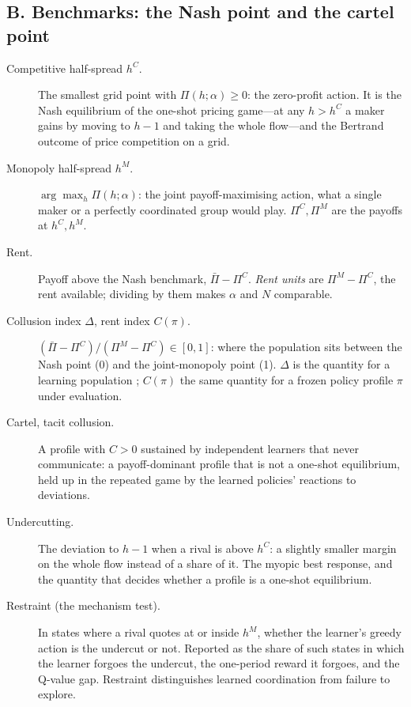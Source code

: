 \subsection*{B. Benchmarks: the Nash point and the cartel point}
\begin{description}
\item[Competitive half-spread $h^C$.] The smallest grid point with $\Pi(h;\alpha)\ge0$: the zero-profit action. It is the Nash equilibrium of the one-shot pricing game---at any $h>h^C$ a maker gains by moving to $h-1$ and taking the whole flow---and the Bertrand outcome of price competition on a grid.
\item[Monopoly half-spread $h^M$.] $\arg\max_h\Pi(h;\alpha)$: the joint payoff-maximising action, what a single maker or a perfectly coordinated group would play. $\Pi^C,\Pi^M$ are the payoffs at $h^C,h^M$.
\item[Rent.] Payoff above the Nash benchmark, $\bar\Pi-\Pi^C$. \emph{Rent units} are $\Pi^M-\Pi^C$, the rent available; dividing by them makes $\alpha$ and $N$ comparable.
\item[Collusion index $\Delta$, rent index $C(\pi)$.] $(\bar\Pi-\Pi^C)/(\Pi^M-\Pi^C)\in[0,1]$: where the population sits between the Nash point (0) and the joint-monopoly point (1). $\Delta$ is the quantity for a learning population \cite{calvano}; $C(\pi)$ the same quantity for a frozen policy profile $\pi$ under evaluation.
\item[Cartel, tacit collusion.] A profile with $C>0$ sustained by independent learners that never communicate: a payoff-dominant profile that is not a one-shot equilibrium, held up in the repeated game by the learned policies' reactions to deviations.
\item[Undercutting.] The deviation to $h-1$ when a rival is above $h^C$: a slightly smaller margin on the whole flow instead of a share of it. The myopic best response, and the quantity that decides whether a profile is a one-shot equilibrium.
\item[Restraint (the mechanism test).] In states where a rival quotes at or inside $h^M$, whether the learner's greedy action is the undercut or not. Reported as the share of such states in which the learner forgoes the undercut, the one-period reward it forgoes, and the Q-value gap. Restraint distinguishes learned coordination from failure to explore.
\end{description}

